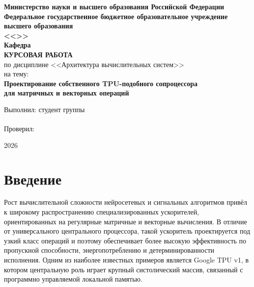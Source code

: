 \documentclass[12pt,a4paper]{article}
\begin{document}
\begin{titlepage}
    \begin{center}
        \textbf{Министерство науки и высшего образования Российской Федерации}\\
        \textbf{Федеральное государственное бюджетное образовательное учреждение высшего образования}\\
        \textbf{<<\hspace{9cm}>>}\\[1cm]
        \textbf{Кафедра \hspace{8cm}}\\[3cm]

        {\large \textbf{КУРСОВАЯ РАБОТА}}\\[0.5cm]
        по дисциплине <<Архитектура вычислительных систем>>\\[0.8cm]
        на тему:\\[0.3cm]
        {\Large \textbf{Проектирование собственного TPU-подобного сопроцессора}}\\
        {\Large \textbf{для матричных и векторных операций}}\\[2.5cm]
    \end{center}

    \begin{flushright}
        Выполнил: студент группы \underline{\hspace{4cm}}\\[0.3cm]
        \underline{\hspace{5.2cm}}\\[0.8cm]
        Проверил: \underline{\hspace{5cm}}\\[0.3cm]
        \underline{\hspace{5.2cm}}
    \end{flushright}

    \vfill
    \begin{center}
        2026
    \end{center}
\end{titlepage}

\tableofcontents
\newpage

\section*{Введение}

Рост вычислительной сложности нейросетевых и сигнальных алгоритмов привёл к широкому распространению специализированных ускорителей, ориентированных на регулярные матричные и векторные вычисления. В отличие от универсального центрального процессора, такой ускоритель проектируется под узкий класс операций и поэтому обеспечивает более высокую эффективность по пропускной способности, энергопотреблению и детерминированности исполнения. Одним из наиболее известных примеров является Google TPU v1, в котором центральную роль играет крупный систолический массив, связанный с программно управляемой локальной памятью.
\end{document}
